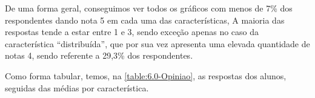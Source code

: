 



De uma forma geral, conseguimos ver todos os gráficos com menos de 7\% dos respondentes dando nota 5 em cada uma das características, A maioria das respostas tende a estar entre 1 e 3, sendo exceção apenas no caso da característica ``distribuída'', que por sua vez apresenta uma elevada quantidade de notas 4, sendo referente a 29,3\% dos respondentes.

Como forma tabular, temos, na \autoref{table:6.0-Opiniao}, as respostas dos alunos, seguidas das médias por característica.

